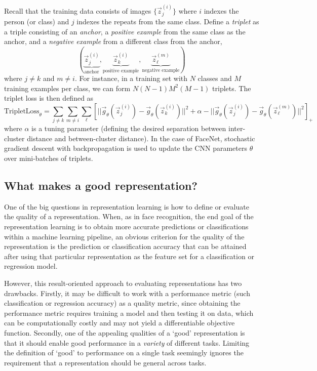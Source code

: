 Recall that the training data consists of images $\{\vec{z}_j^{(i)}\}$
where $i$ indexes the person (or class) and $j$ indexes the repeats
from the same class.  Define a \emph{triplet} as a triple consisting
of an \emph{anchor}, a \emph{positive example} from the same class as
the anchor, and a \emph{negative example} from a different class from
the anchor,
\[
(\underbrace{\vec{z}_j^{(i)}}_{\text{anchor}}, \underbrace{\vec{z}_k^{(i)}}_{\text{positive example}}, \underbrace{\vec{z}_\ell^{(m)}}_{\text{negative example}})
\]
where $j \neq k$ and $m \neq i$.  For instance, in a training set with
$N$ classes and $M$ training examples per class, we can form
$N(N-1)M^2(M-1)$ triplets.  The triplet loss is then defined as
\[
\text{TripletLoss}_{\theta} = \sum_{j \neq k} \sum_{m \neq i} \sum_\ell 
[||\vec{g}_\theta(\vec{z}_j^{(i)}) - \vec{g}_\theta(\vec{z}_k^{(i)})||^2 + \alpha
 - ||\vec{g}_\theta(\vec{z}_j^{(i)}) - \vec{g}_\theta(\vec{z}_\ell^{(m)})||^2]_+
\]
where $\alpha$ is a tuning parameter (defining the desired separation
between inter-cluster distance and between-cluster distance).  In the
case of FaceNet, stochastic gradient descent with backpropagation is
used to update the CNN parameters $\theta$ over mini-batches of
triplets.

\subsection{What makes a good representation?}

One of the big questions in representation learning is how to define
or evaluate the quality of a
representation\cite{bengio2013representation}.  When, as in face
recognition, the end goal of the representation learning is to obtain
more accurate predictions or classifications within a machine learning
pipeline, an obvious criterion for the quality of the representation
is the prediction or classification accuracy that can be attained
after using that particular representation as the feature set for a
classification or regression model.

However, this result-oriented approach to evaluating representations
has two drawbacks.  Firstly, it may be difficult to work with a
performance metric (such classification or regression accuracy) as a
quality metric, since obtaining the performance metric requires
training a model and then testing it on data, which can be
computationally costly and may not yield a differentiable objective
function.  Secondly, one of the appealing qualities of a `good'
representation is that it should enable good performance in a
\emph{variety} of different tasks.  Limiting the definition of `good'
to performance on a single task seemingly ignores the requirement that
a representation should be general across tasks.

